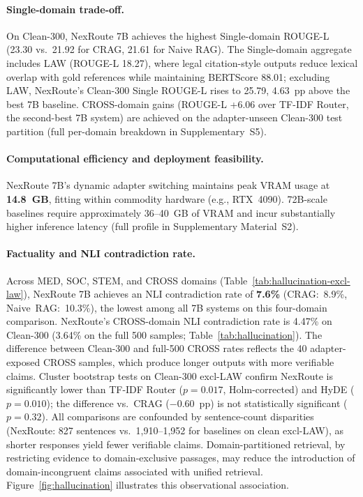 \documentclass[a4paper,fleql,doubleblind]{cas-sc}
\begin{document}
\paragraph{Single-domain trade-off.}
On Clean-300, NexRoute 7B achieves the highest Single-domain ROUGE-L (23.30 vs.\ 21.92 for CRAG, 21.61 for Naive RAG). The Single-domain aggregate includes LAW (ROUGE-L 18.27), where legal citation-style outputs reduce lexical overlap with gold references while maintaining BERTScore 88.01; excluding LAW, NexRoute's Clean-300 Single ROUGE-L rises to 25.79, 4.63~pp above the best 7B baseline. CROSS-domain gains (ROUGE-L +6.06 over TF-IDF Router, the second-best 7B system) are achieved on the adapter-unseen Clean-300 test partition (full per-domain breakdown in Supplementary~S5).

\paragraph{Computational efficiency and deployment feasibility.}
NexRoute 7B's dynamic adapter switching maintains peak VRAM usage at
\textbf{14.8~GB}, fitting within commodity hardware (e.g., RTX~4090).
72B-scale baselines require approximately 36--40~GB of VRAM and incur
substantially higher inference latency (full profile in Supplementary Material~S2).

\paragraph{Factuality and NLI contradiction rate.}
Across MED, SOC, STEM, and CROSS domains (Table~\ref{tab:hallucination-excl-law}), NexRoute 7B achieves an NLI contradiction rate of \textbf{7.6\%} (CRAG:~8.9\%, Naive~RAG:~10.3\%), the lowest among all 7B systems on this four-domain comparison.
NexRoute's CROSS-domain NLI contradiction rate is 4.47\% on Clean-300 (3.64\% on the full 500 samples; Table~\ref{tab:hallucination}).
The difference between Clean-300 and full-500 CROSS rates reflects the 40 adapter-exposed CROSS samples, which produce longer outputs with more verifiable claims.
Cluster bootstrap tests on Clean-300 excl-LAW confirm NexRoute is significantly lower than TF-IDF Router ($p{=}0.017$, Holm-corrected) and HyDE ($p{=}0.010$); the difference vs.\ CRAG ($-0.60$~pp) is not statistically significant ($p{=}0.32$).
All comparisons are confounded by sentence-count disparities (NexRoute: 827 sentences vs.\ 1,910--1,952 for baselines on clean excl-LAW), as shorter responses yield fewer verifiable claims.
Domain-partitioned retrieval, by restricting evidence to domain-exclusive
passages, may reduce the introduction of domain-incongruent claims associated
with unified retrieval.
Figure~\ref{fig:hallucination} illustrates this observational association.
\end{document}
